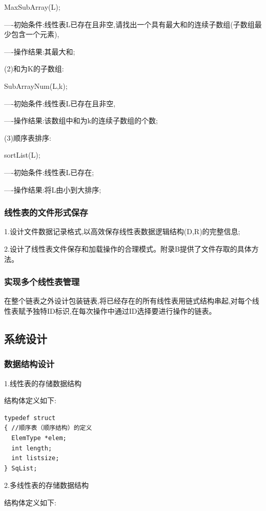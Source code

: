 \documentclass[supercite]{Experimental_Report}
\theoremstyle{definition}
\begin{document}
MaxSubArray(L); 

----初始条件:线性表L已存在且非空,请找出一个具有最大和的连续子数组(子数组最少包含一个元素),

----操作结果:其最大和;

(2)和为K的子数组:

SubArrayNum(L,k); 

----初始条件:线性表L已存在且非空, 

----操作结果:该数组中和为k的连续子数组的个数;

(3)顺序表排序:

sortList(L);

----初始条件:线性表L已存在;

----操作结果:将L由小到大排序;

\subsubsection{线性表的文件形式保存}

1.设计文件数据记录格式,以高效保存线性表数据逻辑结构(D,{R})的完整信息;

2.设计了线性表文件保存和加载操作的合理模式。附录B提供了文件存取的具体方法。

\subsubsection{实现多个线性表管理}

在整个链表之外设计包装链表,将已经存在的所有线性表用链式结构串起,对每个线性表赋予独特ID标识,在每次操作中通过ID选择要进行操作的链表。

\subsection{系统设计}

\subsubsection{数据结构设计}

1.线性表的存储数据结构

结构体定义如下:

\begin{lstlisting}
typedef struct
{ //顺序表（顺序结构）的定义
  ElemType *elem;
  int length;
  int listsize;
} SqList;
\end{lstlisting}

2.多线性表的存储数据结构

结构体定义如下:
\end{document}
